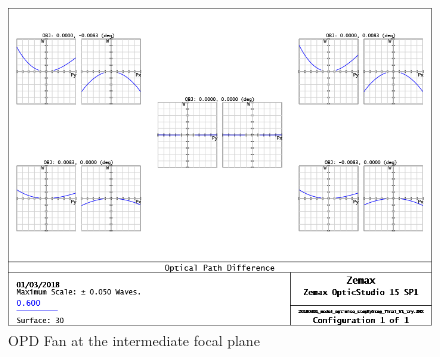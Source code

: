 \documentclass[12pt,a4paper]{article}
\begin{document}
\begin{figure}[H]
	\begin{center}
		\includegraphics[width=.5\textwidth]{images/OPD_Fan_Intermediate_FP_2nd_approach.PNG}
		\caption{OPD Fan at the intermediate focal plane}\label{fig:OPD_Fan_Intermediate_FP_2nd_approach}
	\end{center}
\end{figure}
\end{document}
